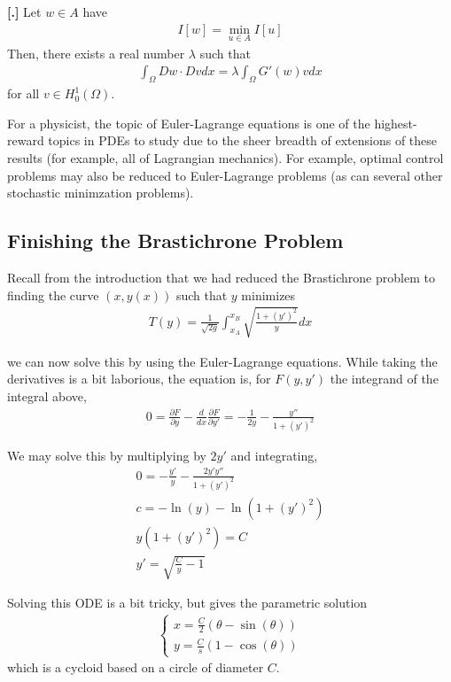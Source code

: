 \documentclass{article}
\newcommand{\pd}{\partial}
\newcounter{result}[section]
\newenvironment{res}[1][]{\refstepcounter{result}\par\medskip
	\noindent \textbf{[\thesection.\theresult] #1} \rmfamily}{\medskip}
\begin{document}
	\begin{res}
		Let $w\in A$ have 
		\begin{align*}
			I[w] = \min_{u\in A} I[u]
		\end{align*}
		Then, there exists a real number $\lambda$ such that 
		\begin{align*}
			\int_{\Omega} Dw \cdot Dv dx = \lambda \int_{\Omega} G'(w)v dx
		\end{align*}
		for all $v \in H^{1}_{0}(\Omega)$. 
	\end{res}
	
	For a physicist, the topic of Euler-Lagrange equations is one of the highest-reward topics in PDEs to study due to the sheer breadth of extensions of these results (for example, all of Lagrangian mechanics). For example, optimal control problems may also be reduced to Euler-Lagrange problems (as can several other stochastic minimzation problems).  
	
	
	\subsection{Finishing the Brastichrone Problem}
	
	Recall from the introduction that we had reduced the Brastichrone problem to finding the curve $(x,y(x))$ such that $y$ minimizes
	\begin{align*}
		T(y) = \frac{1}{\sqrt{2g}} \int_{x_A}^{x_B} \sqrt{\frac{1+(y')^{2}}{y}} dx
	\end{align*}
	
	we can now solve this by using the Euler-Lagrange equations. While taking the derivatives is a bit laborious, the equation is, for $F(y,y')$ the integrand of the integral above,
	\begin{align*}
		0 = \frac{\pd F}{\pd y} - \frac{d}{dx} \frac{\pd F}{\pd y'}=-\frac{1}{2y} - \frac{y''}{1+(y')^{2}}
	\end{align*}
	
	We may solve this by multiplying by $2y'$ and integrating,
	\begin{align*}
		0 = -\frac{y'}{y} - \frac{2y'y''}{1+(y')^{2}} \\
		c = -\ln(y) - \ln(1+(y')^{2}) \\
		y(1+(y')^2) = C \\
		y' = \sqrt{\frac{C}{y}-1}
	\end{align*}
	
	Solving this ODE is a bit tricky, but gives the parametric solution 
	\begin{align*}
		\begin{cases}
			x = \frac{C}{2}(\theta - \sin(\theta)) \\
			y = \frac{C}{s}(1-\cos(\theta))
		\end{cases}
	\end{align*}
	which is a cycloid based on a circle of diameter $C$. 
	
\end{document}
